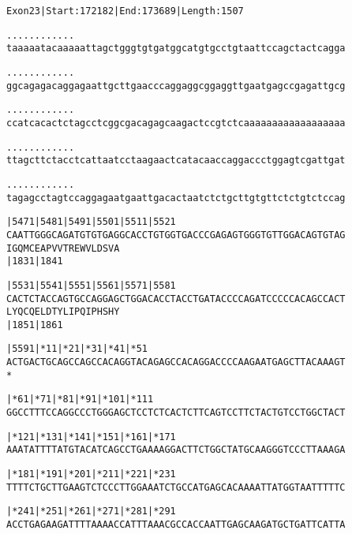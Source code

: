 \documentclass{article}
\begin{document}
\begin{alltt}
Exon 23 | Start: 172182 | End: 173689 | Length: 1507

.    .    .    .    .    .    .    .    .    .    .    .    
taaaaatacaaaaattagctgggtgtgatggcatgtgcctgtaattccagctactcagga

.    .    .    .    .    .    .    .    .    .    .    .    
ggcagagacaggagaattgcttgaacccaggaggcggaggttgaatgagccgagattgcg

.    .    .    .    .    .    .    .    .    .    .    .    
ccatcacactctagcctcggcgacagagcaagactccgtctcaaaaaaaaaaaaaaaaaa

.    .    .    .    .    .    .    .    .    .    .    .    
ttagcttctacctcattaatcctaagaactcatacaaccaggaccctggagtcgattgat

.    .    .    .    .    .    .    .    .    .    .    .    
tagagcctagtccaggagaatgaattgacactaatctctgcttgtgttctctgtctccag

   |5471     |5481     |5491     |5501     |5511     |5521  
CAATTGGGCAGATGTGTGAGGCACCTGTGGTGACCCGAGAGTGGGTGTTGGACAGTGTAG
  I  G  Q  M  C  E  A  P  V  V  T  R  E  W  V  L  D  S  V  A
                       |1831                         |1841  

   |5531     |5541     |5551     |5561     |5571     |5581  
CACTCTACCAGTGCCAGGAGCTGGACACCTACCTGATACCCCAGATCCCCCACAGCCACT
  L  Y  Q  C  Q  E  L  D  T  Y  L  I  P  Q  I  P  H  S  H  Y
                       |1851                         |1861  

   |5591       |*11      |*21      |*31      |*41      |*51 
ACTGACTGCAGCCAGCCACAGGTACAGAGCCACAGGACCCCAAGAATGAGCTTACAAAGT
  *   

     |*61      |*71      |*81      |*91      |*101     |*111
GGCCTTTCCAGGCCCTGGGAGCTCCTCTCACTCTTCAGTCCTTCTACTGTCCTGGCTACT

     |*121     |*131     |*141     |*151     |*161     |*171
AAATATTTTATGTACATCAGCCTGAAAAGGACTTCTGGCTATGCAAGGGTCCCTTAAAGA

     |*181     |*191     |*201     |*211     |*221     |*231
TTTTCTGCTTGAAGTCTCCCTTGGAAATCTGCCATGAGCACAAAATTATGGTAATTTTTC

     |*241     |*251     |*261     |*271     |*281     |*291
ACCTGAGAAGATTTTAAAACCATTTAAACGCCACCAATTGAGCAAGATGCTGATTCATTA

\end{alltt}
\newpage
\end{document}
